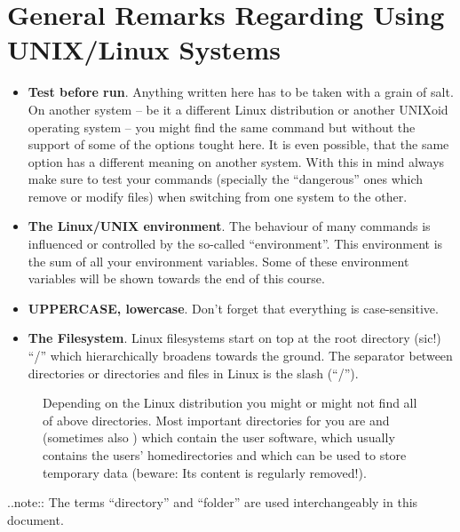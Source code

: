 \documentclass[letterpaper,10pt,english]{sphinxmanual}
\begin{document}
\section{General Remarks Regarding Using UNIX/Linux Systems}
\label{introduction:general-remarks-regarding-using-unix-linux-systems}\begin{itemize}
\item {} 
\textbf{Test before run}. Anything written here has to be taken with a grain of salt. On another system – be it a different Linux distribution or another UNIXoid operating system – you might find the same command but without the support of some of the options tought here. It is even possible, that the same option has a different meaning on another system. With this in mind always make sure to test your commands (specially the “dangerous” ones which remove or modify files) when switching from one system to the other.

\item {} 
\textbf{The Linux/UNIX environment}. The behaviour of many commands is influenced or controlled by the so-called “environment”. This environment is the sum of all your environment variables. Some of these environment variables will be shown towards the end of this course.

\item {} 
\textbf{UPPERCASE, lowercase}. Don’t forget that everything is case-sensitive.

\item {} 
\textbf{The Filesystem}. Linux filesystems start on top at the root directory (sic!) “/” which hierarchically broadens towards the ground.  The separator between directories or directories and files in Linux is the slash (“/”).

\end{itemize}
\begin{figure}[htbp]
\centering
\capstart

\caption{Depending on the Linux distribution you might or might not find all of above
directories. Most important directories for you are  and 
(sometimes also ) which contain the user software,  which
usually contains the users’ homedirectories and  which can be used to store
temporary data (beware: Its content is regularly removed!).}\end{figure}

..note:: The terms “directory” and “folder” are used interchangeably in this document.
\end{document}
